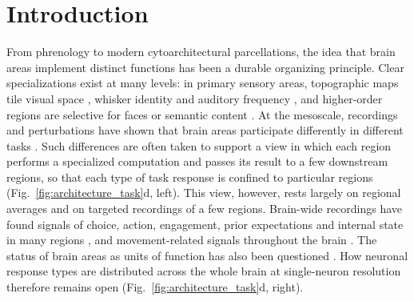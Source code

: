\documentclass[10pt,lineno]{elife}
\begin{document}
\section{Introduction}
From phrenology to modern cytoarchitectural parcellations, the idea that brain areas implement distinct functions has been a durable organizing principle. Clear specializations exist at many levels: in primary sensory areas, topographic maps tile visual space \cite{van2021mouse}, whisker identity \cite{petersen2007functional} and auditory frequency \cite{hackett2011linking}, and higher-order regions are selective for faces \cite{kanwisher1997fusiform, tsao2006cortical} or semantic content \cite{rajimehr2024functional}. At the mesoscale, recordings and perturbations have shown that brain areas participate differently in different tasks \cite{inacio2025brain, roy2022brain, stafford2014large, whitesell2021regional, chen2024brain, khilkevich2024brain, macdowell2025multiplexed, shahsavarani2023cortex}. Such differences are often taken to support a view in which each region performs a specialized computation and passes its result to a few downstream regions, so that each type of task response is confined to particular regions (Fig.~\ref{fig:architecture_task}d, left). This view, however, rests largely on regional averages and on targeted recordings of a few regions. Brain-wide recordings have found signals of choice, action, engagement, prior expectations and internal state in many regions \cite{steinmetz2019distributed, allen2019thirst, findling2023brain, international2025brain}, and movement-related signals throughout the brain \cite{stringer2019spontaneous, musall2019single, tseng2022shared}. The status of brain areas as units of function has also been questioned \cite{hayden2025rethinking}. How neuronal response types are distributed across the whole brain at single-neuron resolution therefore remains open (Fig.~\ref{fig:architecture_task}d, right).

\end{document}
